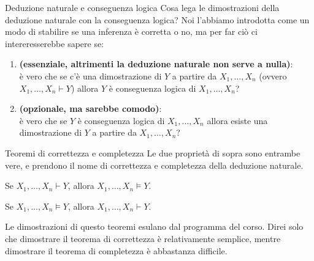 \documentclass[aspectratio=169,10pt,dvipsnames,xcolor=table,handout]{beamer}
\begin{document}
\begin{frame}{Deduzione naturale e conseguenza logica}
    Cosa lega le dimostrazioni della deduzione naturale con la conseguenza logica? Noi l'abbiamo introdotta come un modo di stabilire se una inferenza è corretta o no, ma per far ciò ci intereresserebbe sapere se:
    \begin{enumerate}
        \item \textbf{(essenziale, altrimenti la deduzione naturale non serve a nulla)}:\\
        è vero che se c'è una dimostrazione di $Y$ a partire da $X_1, \ldots, X_n$ (ovvero $X_1, \ldots, X_n \vdash Y$) allora $Y$ è conseguenza logica di $X_1, \ldots, X_n$?
        \item \textbf{(opzionale, ma sarebbe comodo)}:\\
        è vero che se $Y$ è conseguenza logica di $X_1, \ldots, X_n$ allora esiste una dimostrazione di $Y$ a partire da $X_1, \ldots, X_n$?
    \end{enumerate}
\end{frame}

\begin{frame}{Teoremi di correttezza e completezza}
    Le due proprietà di sopra sono entrambe vere, e prendono il nome di \alert{correttezza} e \alert{completezza} della deduzione naturale.

    \begin{theorem}
        Se $X_1, \ldots, X_n \vdash Y$, allora $X_1, \ldots, X_n \models Y$.
    \end{theorem}

    \begin{theorem}
        Se $X_1, \ldots, X_n \models Y$, allora $X_1, \ldots, X_n \vdash Y$.
    \end{theorem}

    \medskip
    Le dimostrazioni di questo teoremi esulano dal programma del corso. Direi solo che dimostrare il teorema di correttezza è relativamente semplice, mentre dimostrare il teorema di completezza è abbastanza difficile.
\end{frame}
\end{document}
